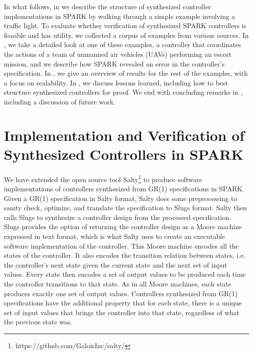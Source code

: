 \documentclass[runningheads]{llncs}
\begin{document}
In what follows, in  we describe the structure of synthesized controller implementations in SPARK 
by walking through a simple example involving a traffic light. 
To evaluate whether verification of synthesized SPARK controllers is feasible and has utility, 
we collected a corpus of examples from various sources. 
In , we take a detailed look at one of these examples, a controller that coordinates the actions of 
a team of unmanned air vehicles (UAVs) performing an escort mission, 
and we describe how SPARK revealed an error in the controller's specification. 
In , we give an overview of results for the rest of the examples, with a focus on scalability. 
In , we discuss lessons learned, including how to best structure synthesized controllers for proof.  
We end with concluding remarks in , including a discussion of future work.

\section{Implementation and Verification of Synthesized Controllers in SPARK}
\label{sec:implementation}

We have extended the open source tool Salty\footnote{https://github.com/GaloisInc/salty/} to produce software implementations of controllers synthesized from GR(1) specifications in SPARK. 
Given a GR(1) specification in Salty format, Salty does some preprocessing to sanity check, optimize, and translate the specification to Slugs format. 
Salty then calls Slugs to synthesize a controller design from the processed specification. 
Slugs provides the option of returning the controller design as a Moore machine expressed in text format, 
which is what Salty uses to create an executable software implementation of the controller. 
This Moore machine encodes all the states of the controller. %
It also encodes the transition relation between states, i.e. the controller's next state given the current state 
and the next set of input values. 
Every state then encodes a set of output values to be produced each time the controller transitions to that state. 
As in all Moore machines, each state produces exactly one set of output values. 
Controllers synthesized from GR(1) specifications have the additional property that for each state, 
there is a unique set of input values that brings the controller into that state, regardless of what the previous state was.
\end{document}

